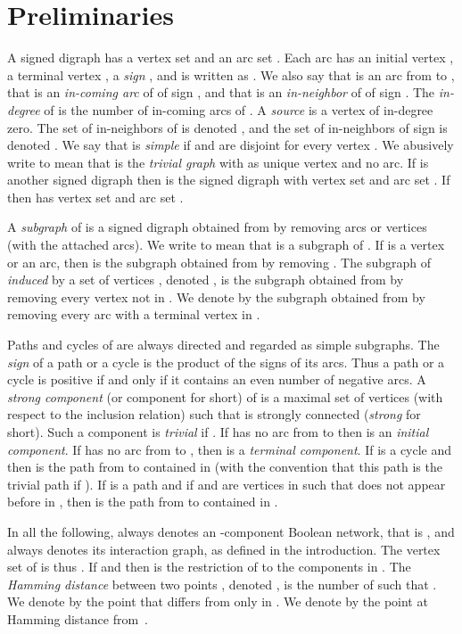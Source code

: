 \documentclass[11pt,a4paper]{article}
\begin{document}
\section{Preliminaries}\label{sec:preliminaries}


A signed digraph  has a vertex set  and an arc set . Each arc  has an initial vertex , a terminal vertex , a {\em sign} , and is written as . We also say that  is an arc from  to , that  is an {\em in-coming arc} of  of sign , and that  is an {\em in-neighbor} of  of sign . The {\em in-degree} of  is the number of in-coming arcs of . A {\em source} is a vertex of in-degree zero. The set of in-neighbors of  is denoted , and the set of in-neighbors of sign  is denoted . We say that  is {\em simple} if  and  are disjoint for every vertex . We abusively write  to mean that  is the {\em trivial graph} with  as unique vertex and no arc. If  is another signed digraph then  is the signed digraph with vertex set  and arc set . If  then  has vertex set  and arc set . 

\medskip
A {\em subgraph} of  is a signed digraph obtained from  by removing arcs or vertices (with the attached arcs). We write  to mean that  is a subgraph of . If  is a vertex or an arc, then  is the subgraph obtained from  by removing . The subgraph of  {\em induced} by a set of vertices , denoted , is the subgraph obtained from  by removing every vertex not in . We denote by  the subgraph obtained from  by removing every arc with a terminal vertex in . 

\medskip
Paths and cycles of  are always directed and regarded as simple subgraphs. The {\em sign} of a path or a cycle is the product of the signs of its arcs. Thus a path or a cycle is positive if and only if it contains an even number of negative arcs. A {\em strong component} (or component for short) of  is a maximal set of vertices  (with respect to the inclusion relation) such that  is strongly connected ({\em strong} for short). Such a component  is {\em trivial} if . If  has no arc from  to  then  is an {\em initial component}. If  has no arc from  to , then  is a {\em terminal component}. If  is a cycle and  then  is the path from  to  contained in  (with the convention that this path is the trivial path  if ). If  is a path and if  and  are vertices in  such that  does not appear before  in , then  is the path from  to  contained in .  

\medskip
In all the following,  always denotes an -component Boolean network, that is , and  always denotes its interaction graph, as defined in the introduction. The vertex set of  is thus . If  and  then  is the restriction of  to the components in . The {\em Hamming distance} between two points , denoted , is the number of  such that . We denote by  the point  that differs from  only in . We denote by  the point at Hamming distance  from~. 
\end{document}
